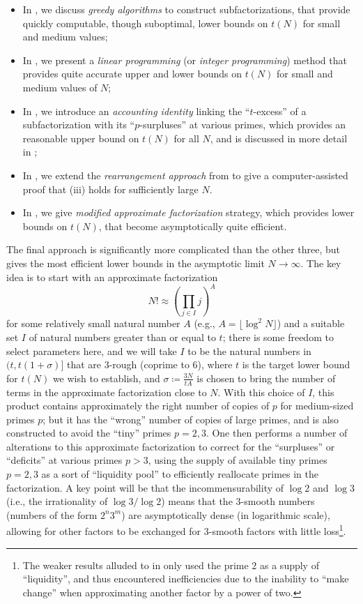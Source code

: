 \documentclass[12pt,a4paper,reqno]{amsart}
\numberwithin{equation}{section}
\theoremstyle{plain}
\theoremstyle{definition}
\begin{document}
\begin{itemize}
  \item In , we discuss \emph{greedy algorithms} to construct subfactorizations, that provide quickly computable, though suboptimal, lower bounds on $t(N)$ for small and medium values;
  \item In , we present a \emph{linear programming} (or \emph{integer programming}) method that provides quite accurate upper and lower bounds on $t(N)$ for small and medium values of $N$;
  \item In , we introduce an \emph{accounting identity} linking the ``$t$-excess'' of a subfactorization with its ``$p$-surpluses'' at various primes, which provides an reasonable upper bound on $t(N)$ for all $N$, and is discussed in more detail in ;
  \item In , we extend the \emph{rearrangement approach} from \cite{guy-selfridge} to give a computer-assisted proof that (iii) holds for sufficiently large $N$.
  \item In , we give \emph{modified approximate factorization} strategy, which provides lower bounds on $t(N)$, that become asymptotically quite efficient.
\end{itemize}


The final approach is significantly more complicated than the other three, but gives the most efficient lower bounds in the asymptotic limit $N \to \infty$.  The key idea is to start with an approximate factorization
$$ N! \approx \left(\prod_{j \in I} j\right)^A$$
for some relatively small natural number $A$ (e.g., $A = \lfloor \log^2 N \rfloor$) and a suitable set $I$ of natural numbers greater than or equal to $t$; there is some freedom to select parameters here, and we will take $I$ to be the natural numbers in $(t, t(1+\sigma)]$ that are $3$-rough (coprime to $6$), where $t$ is the target lower bound for $t(N)$ we wish to establish, and $\sigma \coloneqq \frac{3N}{tA}$ is chosen to bring the number of terms in the approximate factorization close to $N$.  With this choice of $I$, this product contains approximately the right number of copies of $p$ for medium-sized primes $p$; but it has the ``wrong'' number of copies of large primes, and is also constructed to avoid the ``tiny'' primes $p=2,3$.  One then performs a number of alterations to this approximate factorization to correct for the ``surpluses'' or ``deficits'' at various primes $p>3$, using the supply of available tiny primes $p=2,3$ as a sort of ``liquidity pool'' to efficiently reallocate primes in the factorization.  A key point will be that the incommensurability of $\log 2$ and $\log 3$ (i.e., the irrationality of $\log 3/\log 2$) means that the $3$-smooth numbers (numbers of the form $2^n 3^m$) are asymptotically dense (in logarithmic scale), allowing for other factors to be exchanged for $3$-smooth factors with little loss\footnote{The weaker results alluded to in  only used the prime $2$ as a supply of ``liquidity'', and thus encountered inefficiencies due to the inability to ``make change'' when approximating another factor by a power of two.}.
\end{document}
